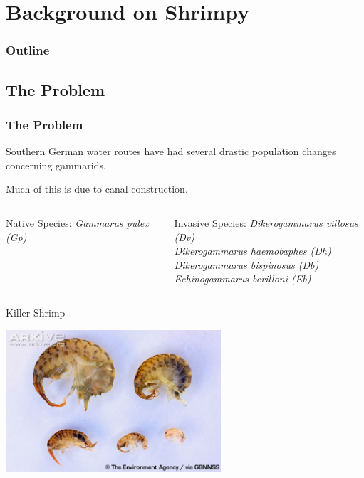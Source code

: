 \section{Background on Shrimpy}


\begin{frame}
  \frametitle{Outline}
  \tableofcontents[ currentsection ]
\end{frame}

\subsection{The Problem}

\begin{frame}
  \frametitle{The Problem}

  Southern German water routes have had several drastic population
  changes concerning gammarids\cite{Dikerogammarus}.

  \vfill

  Much of this is due to canal construction. 

  \begin{columns}[t]
	\begin{block}{Native Species:}
	\textit{Gammarus pulex (Gp)}
	\end{block}

	\begin{block}{Invasive Species:}
    	\textit{Dikerogammarus villosus (Dv)}\\	
	\textit{Dikerogammarus haemobaphes (Dh)}\\
	\textit{Dikerogammarus bispinosus (Db)}\\
	\textit{Echinogammarus berilloni (Eb)}
	\end{block}
  \end{columns}
\end{frame}

\begin{frame}{Killer Shrimp}
  \centerline{\includegraphics[width=8cm]{img/shrimpy1}}

\end{frame}

